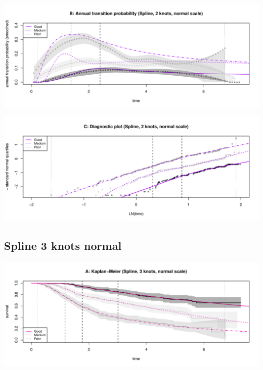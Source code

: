 \documentclass[
]{article}
\begin{document}
\begin{flushleft}\includegraphics[height=0.25\textheight]{Images/spline_norm2-2} \end{flushleft}

\begin{flushleft}\includegraphics[height=0.25\textheight]{Images/spline_norm2-3} \end{flushleft}

\clearpage

\hypertarget{spline-3-knots-normal}{%
\subsection{Spline 3 knots normal}\label{spline-3-knots-normal}}

\begin{flushleft}\includegraphics[height=0.25\textheight]{Images/spline_norm3-1} \end{flushleft}
\end{document}
